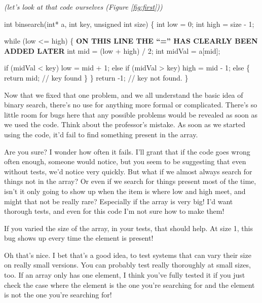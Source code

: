\documentclass[sigplan]{acmart}
\begin{document}
\vspace{0.1in}

\emph{(let's look at that code ourselves (Figure \ref{fig:first}))}

\vspace{0.1in}

\begin{figure*}
  {\scriptsize
  \begin{code}
int binsearch(int* a, int key, unsigned int size) \{
  int low = 0;
  int high = size - 1;
  
  while (low <= high) \{ {\bf ON THIS LINE THE ``='' HAS CLEARLY BEEN ADDED LATER}
    int mid = (low + high) / 2;
    int midVal = a[mid];

    if (midVal < key)
      low = mid + 1;
    else if (midVal > key)
      high = mid - 1;
    else \{
      return mid; // key found
    \}
  \}
  return -1;  // key not found.
\}
\end{code}
}
\caption{C Code on the Whiteboard at the End of Class}
\label{fig:first}
\end{figure*}


  Now that we fixed that one problem, and
we all understand the basic idea of binary search, there's no use for
anything more formal or complicated.  There's so little room for bugs
here that any possible problems would be revealed as soon as we used
the code.  Think about the professor's mistake.  As soon as we started
using the code, it'd fail to find something present in the array.

 Are you sure?  I wonder how often it
fails.  I'll grant that if the code goes wrong often enough, someone
would notice, but you seem to be suggesting that even without tests,
we'd notice very quickly.  But what if we almost always search for
things not in the array?  Or even if we search for things present most
of the time, isn't it only going to show up when the item is where low
and high meet, and might that not be really rare?  Especially if the
array is very big!  I'd want thorough tests, and even for this code
I'm not sure how to make them!

 If you varied the size of the array, in
your tests, that should help.  At size 1, this bug shows up every time
the element is present!

  Oh that's nice.  I bet that's a good
idea, to test systems that can vary their size on really small
versions.  You can probably test really thoroughly at small sizes,
too.  If an array only has one element, I think you've fully tested it
if you just check the case where the element is the one you're
searching for and the element is not the one you're searching for!
\end{document}
